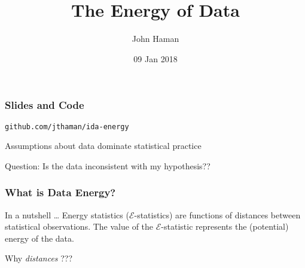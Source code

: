 \documentclass[presentation]{beamer}
\author{John Haman}
\institute{Bowling Green State University, Institute for Defense Analyses}
\date{09 Jan 2018}
\title{The Energy of Data}
\begin{document}
\maketitle

\begin{frame}
  \frametitle{Slides and Code}
  \centering
  \texttt{github.com/jthaman/ida-energy}
\end{frame}

\begin{frame}
  Assumptions about data dominate statistical practice
  \begin{block}{Question:}
    Is the data inconsistent with my hypothesis??
  \end{block}
\end{frame}


\begin{frame}
  \frametitle{What is Data Energy?}
  \begin{centering}
    \begin{block}{In a nutshell \ldots}
      Energy statistics ($\mathcal{E}$-statistics) are functions of distances between statistical
      observations. The value of the $\mathcal{E}$-statistic represents the (potential)
      energy of the data.
    \end{block}
  \end{centering}
  \pause
  \begin{center}
    Why \textit{distances} ??? 
  \end{center}
\end{frame}
\end{document}
